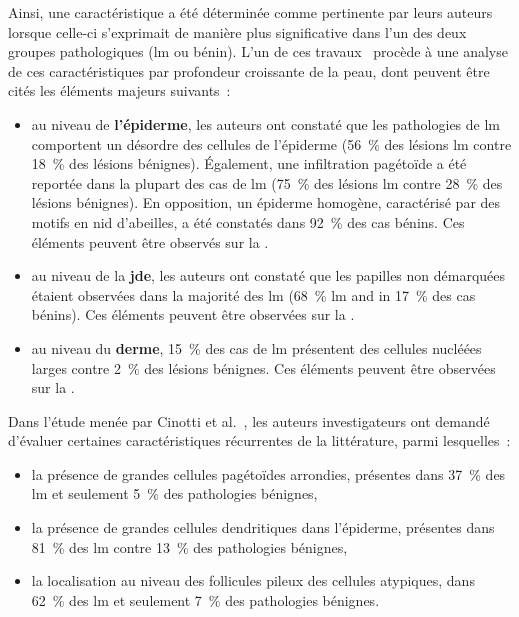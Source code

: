 Ainsi, une caractéristique a été déterminée comme pertinente par leurs auteurs lorsque celle-ci s'exprimait de manière plus significative dans l'un des deux groupes pathologiques (\gls{lm} ou bénin). L'un de ces travaux~\cite{Guitera2010} procède à une analyse de ces caractéristiques par profondeur croissante de la peau, dont peuvent être cités les éléments majeurs suivants~:
\begin{itemize}
    \item au niveau de \textbf{l'épiderme}, les auteurs ont constaté que les pathologies de \gls{lm} comportent un désordre des cellules de l'épiderme (56~\% des lésions \gls{lm} contre 18~\% des lésions bénignes). Également, une infiltration pagétoïde a été reportée dans la plupart des cas de \gls{lm} (75~\% des lésions \gls{lm} contre 28~\% des lésions bénignes). En opposition, un épiderme homogène, caractérisé par des motifs en nid d'abeilles, a été constatés dans 92~\% des cas bénins. Ces éléments peuvent être observés sur la .
    \item au niveau de la \textbf{\gls{jde}}, les auteurs ont constaté que les papilles non démarquées étaient observées dans la majorité des \gls{lm} (68~\% \gls{lm} and in 17~\% des cas bénins). Ces éléments peuvent être observées sur la  .
    \item au niveau du \textbf{derme}, 15~\% des cas de \gls{lm} présentent des cellules nucléées larges contre 2~\% des lésions bénignes. Ces éléments peuvent être observées sur la .
\end{itemize}\par

Dans l'étude menée par Cinotti et al.~\cite{Cinotti2018}, les auteurs investigateurs ont demandé d'évaluer certaines caractéristiques récurrentes de la littérature, parmi lesquelles~:
\begin{itemize}
    \item la présence de grandes cellules pagétoïdes arrondies, présentes dans 37~\% des \gls{lm} et seulement 5~\% des pathologies bénignes,
    \item la présence de grandes cellules dendritiques dans l'épiderme, présentes dans 81~\% des \gls{lm} contre 13~\% des pathologies bénignes,
    \item la localisation au niveau des follicules pileux des cellules atypiques, dans 62~\% des \gls{lm} et seulement 7~\% des pathologies bénignes.
\end{itemize}\par

